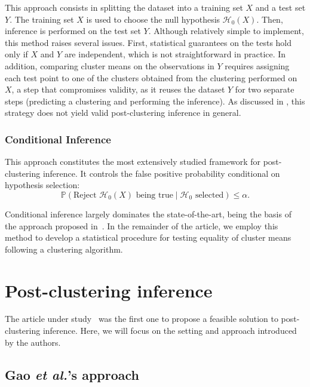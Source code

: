 \documentclass[a4paper,11pt]{article}
\theoremstyle{plain}
\newcommand{\1}{\mathbf{1}}
\begin{document}
This approach consists in splitting the dataset into a training set $X$ and a test set $Y$.  
The training set $X$ is used to choose the null hypothesis $\mathcal{H}_0(X)$. Then, inference is performed on the test set $Y$. Although relatively simple to implement, this method raises several issues. First, statistical guarantees on the tests hold only if $X$ and $Y$ are independent, which is not straightforward in practice. In addition, comparing cluster means on the observations in $Y$ requires assigning each test point to one of the clusters obtained from the clustering performed on $X$, a step that compromises validity, as it reuses the dataset $Y$ for two separate steps (predicting a clustering and performing the inference). As discussed in \cite{Gao}, this strategy does not yield valid post-clustering inference in general.

\subsubsection{Conditional Inference}\label{sec:condi_inf}

This approach constitutes the most extensively studied framework for post-clustering inference.  
It controls the false positive probability conditional on hypothesis selection:  
\begin{equation}\label{condinf}
\mathbb{P}(\text{Reject } \mathcal{H}_0(X) \text{ being true} \mid \mathcal{H}_0 \text{ selected}) \leq \alpha.
\end{equation}

Conditional inference largely dominates the state-of-the-art, being the basis of the approach proposed in~\cite{Gao}. In the remainder of the article, we employ this method to develop a statistical procedure for testing equality of cluster means following a clustering algorithm.

\section{Post-clustering inference}\label{sec:post_clustering_inf}

The article under study~\cite{Gao} was the first one to propose a feasible solution to post-clustering inference. Here, we will focus on the setting and approach introduced by the authors.

\subsection{Gao \textit{et al.}'s approach}\label{sec:gao}
\end{document}
